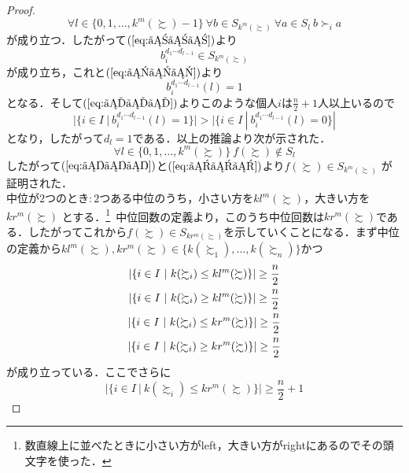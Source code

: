\documentclass[dvipdfmx]{jsarticle}
\begin{document}
\begin{proof}
\begin{equation*}
    \forall l \in \{0,1, \ldots, k^m(\succsim)-1\} \ \forall b \in S_{k^m(\succsim)} \ 
    \forall a \in S_l \ b \succ_i a
  \end{equation*}
  が成り立つ．したがって$(\ref{eq:けけけ})$より
  \begin{equation*}
    b_i^{d_1 \cdots d_{l-1}} \in S_{k^m(\succsim)}
  \end{equation*}
  が成り立ち，これと$(\ref{eq:かかか})$より
  \begin{equation*}
    b_i^{d_1 \cdots d_{l-1}}(l) = 1
  \end{equation*}
  となる．そして$(\ref{eq:いいい})$よりこのような個人$i$は$\frac{n}{2}+1$人以上いるので
  \begin{equation*}
    |\{i \in I \ | \ b_i^{d_1 \cdots d_{l-1}}(l) = 1 \}| >
    |\{i \in I \ | \ b_i^{d_1 \cdots d_{l-1}}(l) = 0 \}|
  \end{equation*}
  となり，したがって$d_l=1$である．以上の推論より次が示された．
  \begin{equation}\label{eq:くくく}
    \forall l \in \{0,1, \ldots, k^m(\succsim)\} \ f(\succsim) \notin S_l
  \end{equation}
  したがって$(\ref{eq:ききき})$と$(\ref{eq:くくく})$より$f(\succsim) \in S_{k^m(\succsim)}$
  が証明された．\\
  中位が$2$つのとき$\colon$$2$つある中位のうち，小さい方を$kl^m(\succsim)$，大きい方を$kr^m(\succsim)$
  とする．\<\footnote{数直線上に並べたときに小さい方がleft，大きい方がrightにあるのでその頭文字を使った．}\
  中位回数の定義より，このうち中位回数は$kr^m(\succsim)$である．したがってこれから$f(\succsim) \in
  S_{kr^m(\succsim)}$を示していくことになる．まず中位の定義から$kl^m(\succsim),kr^m(\succsim) \in
  \{k(\succsim_1),\ldots,k(\succsim_n)\}$かつ
  \begin{gather}
    |\{i \in I \ | \ k(\succsim_i) \leq kl^m(\succsim) \}| \geq \frac{n}{2} \notag \\
    |\{i \in I \ | \ k(\succsim_i) \geq kl^m(\succsim) \}| \geq \frac{n}{2} \label{eq:ててて} \\
    |\{i \in I \ | \ k(\succsim_i) \leq kr^m(\succsim) \}| \geq \frac{n}{2} \label{eq:さささ} \\
    |\{i \in I \ | \ k(\succsim_i) \geq kr^m(\succsim) \}| \geq \frac{n}{2} \notag
  \end{gather}
  が成り立っている．ここでさらに
  \begin{equation}\label{eq:ししし}
    |\{i \in I \ | \ k(\succsim_i) \leq kr^m(\succsim) \}| \geq \frac{n}{2}+1
  \end{equation}
$$
\end{proof}
\end{document}
